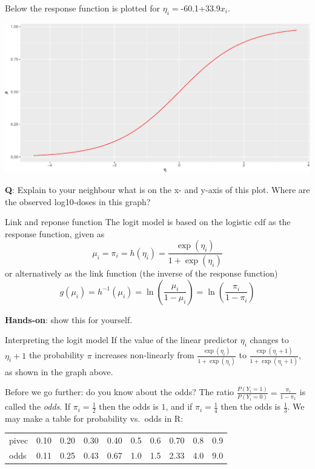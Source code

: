 \documentclass[
  ignorenonframetext,
]{beamer}
\begin{document}
\begin{frame}
Below the response function is plotted for \(\eta_i=\)-60.1+33.9\(x_i\).

\includegraphics{Module03PresentationWeek1_files/figure-beamer/unnamed-chunk-5-1.pdf}

\textbf{Q}: Explain to your neighbour what is on the x- and y-axis of
this plot. Where are the observed log10-doses in this graph?
\end{frame}

\begin{frame}
\begin{block}{Link and reponse function}
\label{link-and-reponse-function}
The logit model is based on the logistic cdf as the response function,
given as \[ \mu_i=\pi_i=h(\eta_i)=\frac{\exp(\eta_i)}{1+\exp(\eta_i)}\]
or alternatively as the link function (the inverse of the response
function)
\[ g(\mu_i)=h^{-1}(\mu_i)=\ln(\frac{\mu_i}{1-\mu_i})=\ln(\frac{\pi_i}{1-\pi_i})\]

\textbf{Hands-on}: show this for yourself.
\end{block}
\end{frame}

\begin{frame}
\begin{block}{Interpreting the logit model}
\label{interpreting-the-logit-model}
If the value of the linear predictor \(\eta_i\) changes to \(\eta_i+1\)
the probability \(\pi\) increases non-linearly from
\(\frac{\exp(\eta_i)}{1+\exp(\eta_i)}\) to
\(\frac{\exp(\eta_i+1)}{1+\exp(\eta_i+1)}\), as shown in the graph
above.
\end{block}
\end{frame}

\begin{frame}
Before we go further: do you know about the odds? The ratio
\(\frac{P(Y_i=1)}{P(Y_i=0)}=\frac{\pi_i}{1-\pi_1}\) is called the
\emph{odds}. If \(\pi_i=\frac{1}{2}\) then the odds is \(1\), and if
\(\pi_i=\frac{1}{4}\) then the odds is \(\frac{1}{3}\). We may make a
table for probability vs.~odds in R:

\begin{longtable}[t]{lrrrrrrrrr}
\toprule
 &  &  &  &  &  &  &  &  & \\
\midrule
pivec & 0.10 & 0.20 & 0.30 & 0.40 & 0.5 & 0.6 & 0.70 & 0.8 & 0.9\\
odds & 0.11 & 0.25 & 0.43 & 0.67 & 1.0 & 1.5 & 2.33 & 4.0 & 9.0\\
\bottomrule
\end{longtable}
\end{frame}
\end{document}
